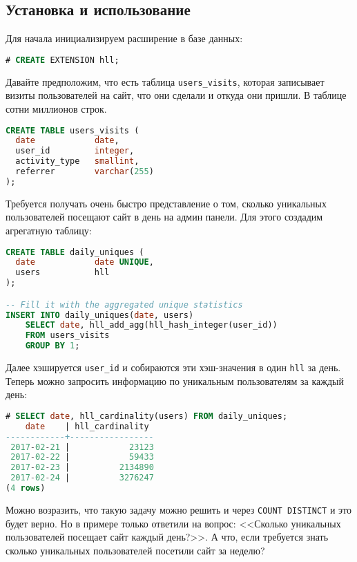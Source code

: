 \subsection{Установка и использование}

Для начала инициализируем расширение в базе данных:

\begin{lstlisting}[language=SQL,label=lst:pghll1,caption=Инициализация hll]
# CREATE EXTENSION hll;
\end{lstlisting}

Давайте предположим, что есть таблица \lstinline!users_visits!, которая записывает визиты пользователей на сайт, что они сделали и откуда они пришли. В таблице сотни миллионов строк.

\begin{lstlisting}[language=SQL,label=lst:pghll2,caption=users\_visits]
CREATE TABLE users_visits (
  date            date,
  user_id         integer,
  activity_type   smallint,
  referrer        varchar(255)
);
\end{lstlisting}

Требуется получать очень быстро представление о том, сколько уникальных пользователей посещают сайт в день на админ панели. Для этого создадим агрегатную таблицу:

\begin{lstlisting}[language=SQL,label=lst:pghll3,caption=daily\_uniques]
CREATE TABLE daily_uniques (
  date            date UNIQUE,
  users           hll
);

-- Fill it with the aggregated unique statistics
INSERT INTO daily_uniques(date, users)
    SELECT date, hll_add_agg(hll_hash_integer(user_id))
    FROM users_visits
    GROUP BY 1;
\end{lstlisting}

Далее хэшируется \lstinline!user_id! и собираются эти хэш-значения в один \lstinline!hll! за день. Теперь можно запросить информацию по уникальным пользователям за каждый день:

\begin{lstlisting}[language=SQL,label=lst:pghll4,caption=daily\_uniques по дням]
# SELECT date, hll_cardinality(users) FROM daily_uniques;
    date    | hll_cardinality
------------+-----------------
 2017-02-21 |            23123
 2017-02-22 |            59433
 2017-02-23 |          2134890
 2017-02-24 |          3276247
(4 rows)
\end{lstlisting}

Можно возразить, что такую задачу можно решить и через \lstinline!COUNT DISTINCT! и это будет верно. Но в примере только ответили на вопрос: <<Сколько уникальных пользователей посещает сайт каждый день?>>. А что, если требуется знать сколько уникальных пользователей посетили сайт за неделю?

